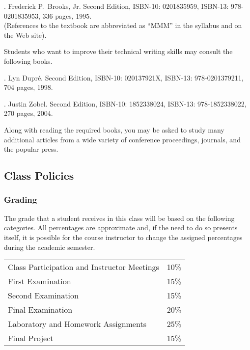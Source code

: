 . Frederick P.\ Brooks, Jr.
Second Edition, ISBN-10: 0201835959, ISBN-13: 978-0201835953, 336 pages, 1995. \\
(References to the textbook are abbreviated as ``MMM'' in the syllabus and on the Web site).

\noindent
Students who want to improve their technical writing skills may consult the following books.

. Lyn Dupr\'e. Second Edition,  ISBN-10: 020137921X,
ISBN-13: 978-0201379211, 704 pages, 1998.

.  Justin Zobel. Second Edition,  ISBN-10: 1852338024, ISBN-13:
978-1852338022, 270 pages, 2004.

\noindent
Along with reading the required books, you may be asked to study many additional articles from a wide variety of
conference proceedings, journals, and the popular press.

\subsection*{Class Policies}

\subsubsection*{Grading}

The grade that a student receives in this class will be based on the following categories. All percentages are
approximate and, if the need to do so presents itself, it is possible for the course instructor to change the assigned
percentages during the academic semester.


\begin{center}
\begin{tabular}{ll}
Class Participation and Instructor Meetings & 10\% \\
First Examination & 15\% \\
Second Examination & 15\% \\
Final Examination & 20\% \\
Laboratory and Homework Assignments & 25\% \\
Final Project & 15\%
\end{tabular}
\end{center}

